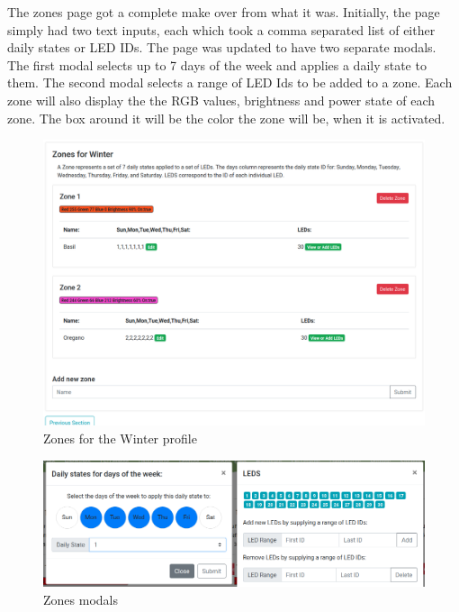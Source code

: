 \documentclass[onecolumn, draftclsnofoot,10pt, compsoc]{IEEEtran}
\begin{document}
		\noindent The zones page got a complete make over from what it was.
		Initially, the page simply had two text inputs, each which took a comma separated list of either daily states or LED IDs.
		The page was updated to have two separate modals. The first modal selects up to 7 days of the week and applies a daily state to them.
		The second modal selects a range of LED Ids to be added to a zone. Each zone will also display the the RGB values, brightness and power state of each 
		zone. The box around it will be the color the zone will be, when it is activated.

		\begin{center}
			\begin{figure}[H]
				\includegraphics[width=\linewidth]{site/zones_winter.png}
				\caption{Zones for the Winter profile}
				\label{fig:siteZonesWinter}
			\end{figure}
		\end{center}
		\begin{center}
			\begin{figure}[H]
				\includegraphics[width=\linewidth]{site/modals.png}
				\caption{Zones modals}
				\label{fig:siteZonesWinterModals}
			\end{figure}
		\end{center}
\end{document}
